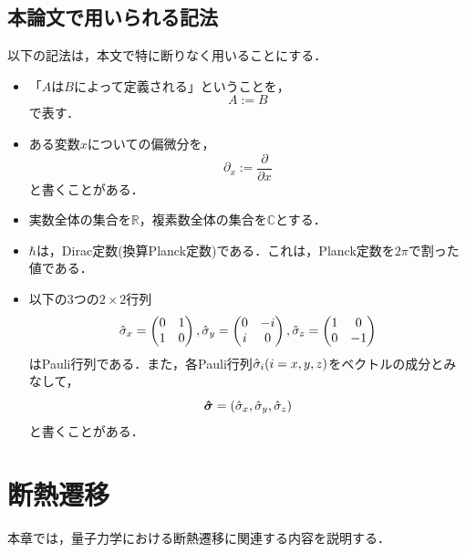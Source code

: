 \documentclass[a4paper, titlepage]{jsreport}
\begin{document}
\section{本論文で用いられる記法}
以下の記法は，本文で特に断りなく用いることにする．\\
\begin{itemize} 
  \item 「$A$は$B$によって定義される」ということを，
  \begin{equation}
    A := B
  \end{equation}
  で表す．
  \item ある変数$x$についての偏微分を，
  \begin{equation}
    \partial_x := \frac{\partial}{\partial x}
  \end{equation}
  と書くことがある．
  \item 実数全体の集合を$\mathbb{R}$，複素数全体の集合を$\mathbb{C}$とする．
  \item $\hbar$は，Dirac定数(換算Planck定数)である．これは，Planck定数を$2\pi$で割った値である．
  \item 以下の3つの$2\times2$行列
\begin{equation}
\Hat{\sigma}_x=
\begin{pmatrix}
    0 & 1\\
    1 & 0\\
\end{pmatrix}
,
\Hat{\sigma}_y=
\begin{pmatrix}
    0 & -i\\
    i & 0\\
\end{pmatrix}
,
\Hat{\sigma}_z=
\begin{pmatrix}
    1 & 0\\
    0 & -1\\
\end{pmatrix}
\end{equation}
はPauli行列である．また，各Pauli行列$\Hat{\sigma}_i (i = x,y,z)$をベクトルの成分とみなして，
\begin{equation}
  \bm{\Hat{\sigma}} = (\Hat{\sigma}_x, \Hat{\sigma}_y, \Hat{\sigma}_z)
\end{equation}
と書くことがある．
\end{itemize}

\chapter{断熱遷移} \label{AT}
本章では，量子力学における断熱遷移に関連する内容を説明する．
\end{document}
